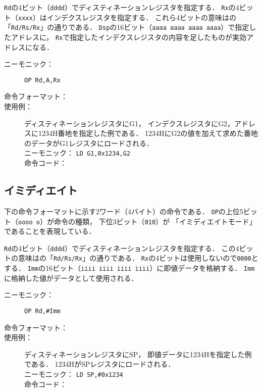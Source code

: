 \texttt{Rd}の4ビット（\texttt{dddd}）でディスティネーションレジスタを指定する．
\texttt{Rx}の4ビット（\texttt{xxxx}）はインデクスレジスタを指定する．
これら4ビットの意味はの「\texttt{Rd/Rs/Rx}」の通りである．
\texttt{Dsp}の16ビット（\texttt{aaaa aaaa aaaa aaaa}）で指定したアドレスに，
\texttt{Rx}で指定したインデクスレジスタの内容を足したものが実効アドレスになる．

\begin{description}
\item[ニーモニック：] \texttt{OP Rd,A,Rx}

\item[命令フォーマット：] %

\item[使用例：] ディスティネーションレジスタにG1，
インデクスレジスタにG2，アドレスに1234H番地を指定した例である．
1234HにG2の値を加えて求めた番地のデータがG1レジスタにロードされる． \\
ニーモニック： \texttt{LD G1,0x1234,G2} \\
命令コード：
\end{description}

\subsection{イミディエイト}
下の命令フォーマットに示す2ワード（4バイト）の命令である．
\texttt{OP}の上位5ビット（\texttt{oooo o}）が命令の種類，
下位3ビット（\texttt{010}）が
「イミディエイトモード」であることを表現している．

\texttt{Rd}の4ビット（\texttt{dddd}）でディスティネーションレジスタを指定する．
この4ビットの意味はの「\texttt{Rd/Rs/Rx}」の通りである．
\texttt{Rx}の4ビットは使用しないので\texttt{0000}とする．
\texttt{Imm}の16ビット（\texttt{iiii iiii iiii iiii}）に即値データを格納する．
\texttt{Imm}に格納した値がデータとして使用される．

\begin{description}
\item[ニーモニック：] \texttt{OP Rd,\#Imm}

\item[命令フォーマット：] %

\item[使用例：] ディスティネーションレジスタにSP，
即値データに1234Hを指定した例である．
1234HがSPレジスタにロードされる． \\
ニーモニック： \texttt{LD SP,\#0x1234} \\
命令コード：
\end{description}

